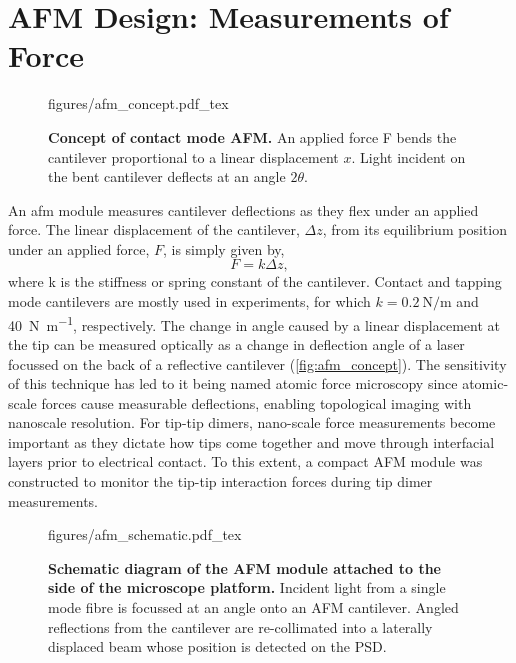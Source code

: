 \documentclass{article}
\begin{document}
\section{AFM Design: Measurements of Force}

\begin{wrapfigure}{O}{0.38\textwidth}
\centering
\vspace{-10pt}
\fontsize{10pt}{1em}\selectfont
\def\svgwidth{\textwidth}
{figures/afm_concept.pdf_tex}
\caption[Concept of contact mode AFM]{\textbf{Concept of contact mode AFM.} An applied force \gls{F} bends the cantilever proportional to a linear displacement $x$. Light incident on the bent cantilever deflects at an angle $2\theta$.}
\label{fig:afm_concept}
\vspace{-5pt}
\end{wrapfigure}

An \gls{afm} module measures cantilever deflections as they flex under an applied force. The linear displacement of the cantilever, $\Delta z$, from its equilibrium position under an applied force, $F$, is simply given by,
\begin{equation}
	F=k\Delta z, \label{eq:hookes_law}
\end{equation}
where \gls{k} is the stiffness or spring constant of the cantilever. Contact and tapping mode cantilevers are mostly used in experiments, for which $k=\SI{0.2}{\newton\per\metre}$ and \SI{40}{\newton\per\metre}, respectively. The change in angle caused by a linear displacement at the tip can be measured optically as a change in deflection angle of a laser focussed on the back of a reflective cantilever (\autoref{fig:afm_concept}). The sensitivity of this technique has led to it being named atomic force microscopy since atomic-scale forces cause measurable deflections, enabling topological imaging with nanoscale resolution. For tip-tip dimers, nano-scale force measurements become important as they dictate how tips come together and move through interfacial layers prior to electrical contact. To this extent, a compact AFM module was constructed to monitor the tip-tip interaction forces during tip dimer measurements.

\begin{figure}[bt]
\centering
{\fontsize{9.5pt}{1em}\selectfont \def\svgwidth{0.8\textwidth} {figures/afm_schematic.pdf_tex}}
\caption[Schematic diagram of the AFM module.]{\textbf{Schematic diagram of the AFM module attached to the side of the microscope platform.} Incident light from a single mode fibre is focussed at an angle onto an AFM cantilever. Angled reflections from the cantilever are re-collimated into a laterally displaced beam whose position is detected on the PSD.}
\label{fig:afm_design}
\end{figure}
\end{document}
